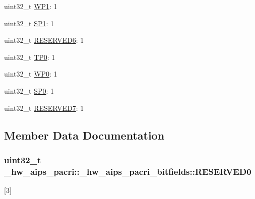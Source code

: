 \begin{DoxyCompactItemize}
\item 
uint32\+\_\+t \hyperlink{struct__hw__aips__pacri_1_1__hw__aips__pacri__bitfields_ab409d6ffd3c82d4de1a87788df53c4ee}{W\+P1}\+: 1
\item 
uint32\+\_\+t \hyperlink{struct__hw__aips__pacri_1_1__hw__aips__pacri__bitfields_a7bd7244a0a62116f63c72c833d63a17d}{S\+P1}\+: 1
\item 
uint32\+\_\+t \hyperlink{struct__hw__aips__pacri_1_1__hw__aips__pacri__bitfields_a9ffd375f7bacd25146ca70eb1fa570ee}{R\+E\+S\+E\+R\+V\+E\+D6}\+: 1
\item 
uint32\+\_\+t \hyperlink{struct__hw__aips__pacri_1_1__hw__aips__pacri__bitfields_a30209f29c7225af8d395cc417809436e}{T\+P0}\+: 1
\item 
uint32\+\_\+t \hyperlink{struct__hw__aips__pacri_1_1__hw__aips__pacri__bitfields_a488c5acde389a64f9e4dc4214d853032}{W\+P0}\+: 1
\item 
uint32\+\_\+t \hyperlink{struct__hw__aips__pacri_1_1__hw__aips__pacri__bitfields_ac538b34d03557b1cb7a24f00e3ebe1b7}{S\+P0}\+: 1
\item 
uint32\+\_\+t \hyperlink{struct__hw__aips__pacri_1_1__hw__aips__pacri__bitfields_adc00fdaf0d7a0d04499e69aea8094ce1}{R\+E\+S\+E\+R\+V\+E\+D7}\+: 1
\end{DoxyCompactItemize}


\subsection{Member Data Documentation}
\subsubsection[{\texorpdfstring{R\+E\+S\+E\+R\+V\+E\+D0}{RESERVED0}}]{\setlength{\rightskip}{0pt plus 5cm}uint32\+\_\+t \+\_\+hw\+\_\+aips\+\_\+pacri\+::\+\_\+hw\+\_\+aips\+\_\+pacri\+\_\+bitfields\+::\+R\+E\+S\+E\+R\+V\+E\+D0}\hypertarget{struct__hw__aips__pacri_1_1__hw__aips__pacri__bitfields_a879cf998d5187eba6ec7ff7175bfb012}{}\label{struct__hw__aips__pacri_1_1__hw__aips__pacri__bitfields_a879cf998d5187eba6ec7ff7175bfb012}
\mbox{[}3\mbox{]} 
